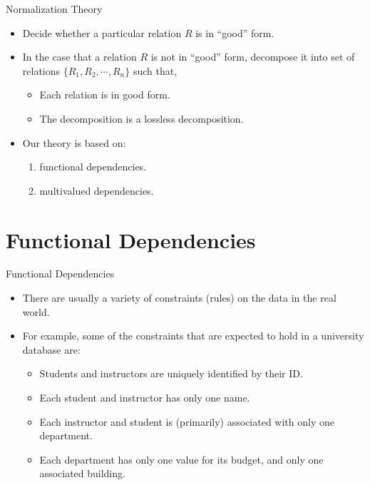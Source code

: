 \documentclass{beamer}
\begin{document}
\begin{frame}{Normalization Theory}
    \begin{itemize}
        \item Decide whether a particular relation $R$ is in ``good'' form.
        \item In the case that a relation $R$ is not in ``good'' form, decompose it into set of relations $\{R_1, R_2, \cdots, R_n\}$ such that,
        \begin{itemize}
            \item Each relation is in good form.
            \item The decomposition is a lossless decomposition.
        \end{itemize}
        \item Our theory is based on:
        \begin{enumerate}
            \item functional dependencies.
            \item multivalued dependencies.
        \end{enumerate}
    \end{itemize}
\end{frame}

\section{Functional Dependencies}

\begin{frame}{Functional Dependencies}
    \begin{itemize}
        \item There are usually a variety of constraints (rules) on the data in the real world.
        \item For example, some of the constraints that are expected to hold in a university database are:
        \begin{itemize}
            \item Students and instructors are uniquely identified by their ID.
            \item Each student and instructor has only one name.
            \item Each instructor and student is (primarily) associated with only one department.
            \item Each department has only one value for its budget, and only one associated building.
        \end{itemize}
    \end{itemize}
\end{frame}
\end{document}
